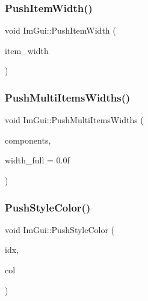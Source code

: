 \subsubsection{\texorpdfstring{Push\+Item\+Width()}{PushItemWidth()}}
{\footnotesize\ttfamily void Im\+Gui\+::\+Push\+Item\+Width (\begin{DoxyParamCaption}\item[{float}]{item\+\_\+width }\end{DoxyParamCaption})}

\mbox{\label{namespace_im_gui_ab913605fcf6d405d102cdf56cd414a5a}} 
\subsubsection{\texorpdfstring{Push\+Multi\+Items\+Widths()}{PushMultiItemsWidths()}}
{\footnotesize\ttfamily void Im\+Gui\+::\+Push\+Multi\+Items\+Widths (\begin{DoxyParamCaption}\item[{int}]{components,  }\item[{float}]{width\+\_\+full = {\ttfamily 0.0f} }\end{DoxyParamCaption})}

\mbox{\label{namespace_im_gui_a77ee84afb636e05eb4b2d6eeddcc2aa8}} 
\subsubsection{\texorpdfstring{Push\+Style\+Color()}{PushStyleColor()}\hspace{0.1cm}{\footnotesize\ttfamily [1/2]}}
{\footnotesize\ttfamily void Im\+Gui\+::\+Push\+Style\+Color (\begin{DoxyParamCaption}\item[{\mbox{\hyperlink{imgui_8h_a1b0467ec582e731ae6292fef726fb5fe}{Im\+Gui\+Col}}}]{idx,  }\item[{\mbox{\hyperlink{imgui_8h_a118cff4eeb8d00e7d07ce3d6460eed36}{Im\+U32}}}]{col }\end{DoxyParamCaption})}

\mbox{\label{namespace_im_gui_a5bd052ebf55015312a53739974950e7b}} 
